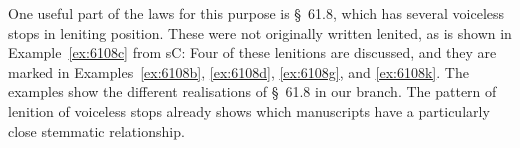 One useful part of the laws for this purpose is §~61.8, which has several voiceless stops in leniting position. These were not originally written lenited, as is shown in Example~\ref{ex:6108c} from \gls{sC}:
Four of these lenitions are discussed, and they are marked in Examples~\ref{ex:6108b}, \ref{ex:6108d}, \ref{ex:6108g}, and \ref{ex:6108k}. The examples show the different realisations of §~61.8 in our branch. The pattern of lenition of voiceless stops already shows which manuscripts have a particularly close stemmatic relationship. 

